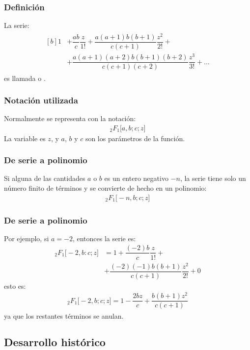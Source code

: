 \documentclass[12pt]{beamer}
\begin{document}
\begin{frame}
\frametitle{Definición}
La serie:
\pause
\begin{align}
\begin{aligned}[b]
1 &+ \dfrac{a b}{c} \dfrac{z}{1!} + \dfrac{a (a {+} 1) b (b {+} 1)}{c( c {+} 1)} \dfrac{z^{2}}{2!} + \\[0.5em]
&+ \dfrac{a (a {+} 1)(a {+} 2) b (b {+} 1)(b {+} 2)}{c (c {+} 1)(c {+} 2)} \dfrac{z^{3}}{3!} + \ldots
\end{aligned}
\label{eq:ecuacion_01_01_01}
\end{align}
es llamada  o .
\end{frame}
\begin{frame}
\frametitle{Notación utilizada}
Normalmente se representa con la notación:
\pause
\begin{align*}
{}_{2} F_{1} \big[ a, b; c; z \big]
\end{align*}
La variable es $z$, y $a$, $b$ y $c$ son los parámetros  de la función.
\end{frame}
\begin{frame}
\frametitle{De serie a polinomio}
Si alguna de las cantidades $a$ o $b$ es un entero negativo $-n$, la serie tiene solo un número finito de términos y se convierte de hecho en un polinomio:
\begin{align*}
{}_{2} F_{1} \big[ -n, b; c; z \big]
\end{align*}
\end{frame}
\begin{frame}
\frametitle{De serie a polinomio}
Por ejemplo, si $a = -2$, entonces la serie es:
\pause
\begin{align*}
{}_{2} F_{1} \big[ -2, b: c; z \big] &= 1 + \dfrac{(-2) b}{c} \dfrac{z}{1!} + \\[0.5em]
&+ \dfrac{(-2) (-1) b (b + 1)}{c( c + 1)} \dfrac{z^{2}}{2!} + 0 
\end{align*}    
esto es:
\pause
\begin{align}
{}_{2} F_{1} \big[ -2, b; c; z \big] = 1 - \dfrac{2 b z}{c} + \dfrac{b( b + 1) z^{2}}{c (c + 1)}
\label{eq:ecuacion_01_01_02}
\end{align}
ya que los restantes términos se anulan.
\end{frame}

\subsection{Desarrollo histórico}
\end{document}
